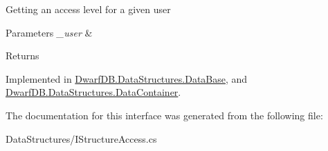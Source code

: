 Getting an access level for a given user 


\begin{DoxyParams}{Parameters}
{\em \+\_\+user} & \\
\hline
\end{DoxyParams}
\begin{DoxyReturn}{Returns}

\end{DoxyReturn}


Implemented in \hyperlink{class_dwarf_d_b_1_1_data_structures_1_1_data_base_ade3f44a53526bbfbe698a18ca62e67a4}{Dwarf\+D\+B.\+Data\+Structures.\+Data\+Base}, and \hyperlink{class_dwarf_d_b_1_1_data_structures_1_1_data_container_ad268483590eb3c6db9f2a71519ab4b6c}{Dwarf\+D\+B.\+Data\+Structures.\+Data\+Container}.



The documentation for this interface was generated from the following file\+:\begin{DoxyCompactItemize}
\item 
Data\+Structures/I\+Structure\+Access.\+cs\end{DoxyCompactItemize}
